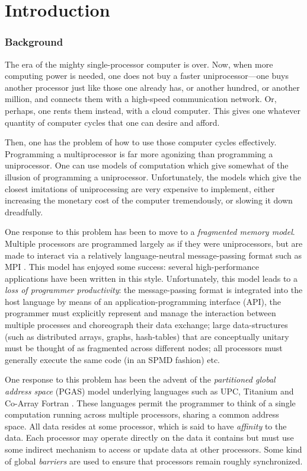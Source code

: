 \chapter{Introduction}

\subsection*{Background}



The era of the mighty single-processor computer is over. Now, when more
computing power is needed, one does not buy a faster uniprocessor---one buys
another processor just like those one already has, or another hundred, or
another million, and connects them with a high-speed communication network.
Or, perhaps, one rents them instead, with a cloud computer. This gives one
whatever quantity of computer cycles that one can desire and afford.

Then, one has the problem of how to use those computer cycles effectively.
Programming a multiprocessor is far more agonizing than programming a
uniprocessor.   One can use models of computation which give somewhat of the
illusion of programming a uniprocessor.  Unfortunately, the models which give
the closest imitations of uniprocessing are very expensive to implement,
either increasing the monetary cost of the computer tremendously, or slowing
it down dreadfully. 

One response to this problem has been to move to a {\em fragmented memory
  model}. Multiple processors are programmed largely as if they were
uniprocessors, but are made to interact via a relatively language-neutral
message-passing format such as MPI \cite{mpi}. This model has enjoyed some
success: several high-performance applications have been written in this
style. Unfortunately, this model leads to a {\em loss of programmer
  productivity}: the message-passing format is integrated into the host
language by means of an application-programming interface (API), the
programmer must explicitly represent and manage the interaction between
multiple processes and choreograph their data exchange; large data-structures
(such as distributed arrays, graphs, hash-tables) that are conceptually
unitary must be thought of as fragmented across different nodes; all
processors must generally execute the same code (in an SPMD fashion) etc.

One response to this problem has been the advent of the {\em
partitioned global address space} (PGAS) model underlying languages
such as UPC, Titanium and Co-Array Fortran \cite{pgas,titanium}. These
languages permit the programmer to think of a single computation
running across multiple processors, sharing a common address
space. All data resides at some processor, which is said to have {\em
affinity} to the data.  Each processor may operate directly on the
data it contains but must use some indirect mechanism to access or
update data at other processors. Some kind of global {\em barriers}
are used to ensure that processors remain roughly synchronized.

